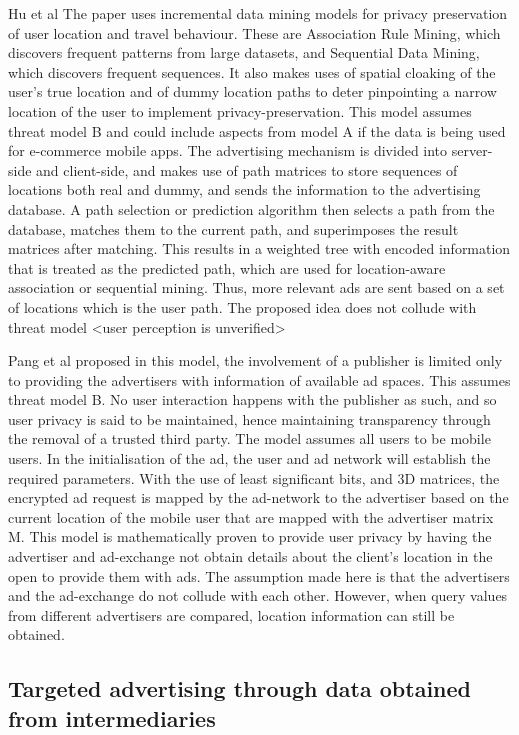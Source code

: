 \documentclass[sigconf,nonacm]{acmart}
\begin{document}
Hu et al \cite{miningforads} The paper uses incremental data mining models for privacy preservation of user location and travel behaviour. These are Association Rule Mining, which discovers frequent patterns from large datasets, and Sequential Data Mining, which discovers frequent sequences. It also makes uses of spatial cloaking of the user’s true location and of dummy location paths to deter pinpointing a narrow location of the user to implement privacy-preservation. This model assumes threat model B and could include aspects from model A if the data is being used for e-commerce mobile apps. The advertising mechanism is divided into server-side and client-side, and makes use of path matrices to store sequences of locations both real and dummy, and sends the information to the advertising database. A path selection or prediction algorithm then selects a path from the database, matches them to the current path, and superimposes the result matrices after matching. This results in a weighted tree with encoded information that is treated as the predicted path, which are used for location-aware association or sequential mining. Thus, more relevant ads are sent based on a set of locations which is the user path. The proposed idea does not collude with threat model <user perception is unverified>

Pang et al \cite{pola} proposed in this model, the involvement of a publisher is limited only to providing the advertisers with information of available ad spaces. This assumes threat model B. No user interaction happens with the publisher as such, and so user privacy is said to be maintained, hence maintaining transparency through the removal of a trusted third party. The model assumes all users to be mobile users. In the initialisation of the ad, the user and ad network will establish the required parameters. With the use of least significant bits, and 3D matrices, the encrypted ad request is mapped by the ad-network to the advertiser based on the current location of the mobile user that are mapped with the advertiser matrix M. This model is mathematically proven to provide user privacy by having the advertiser and ad-exchange not obtain details about the client’s location in the open to provide them with ads. The assumption made here is that the advertisers and the ad-exchange do not collude with each other. However, when query values from different advertisers are compared, location information can still be obtained.  

\subsection{Targeted advertising through data obtained from intermediaries}
\end{document}
